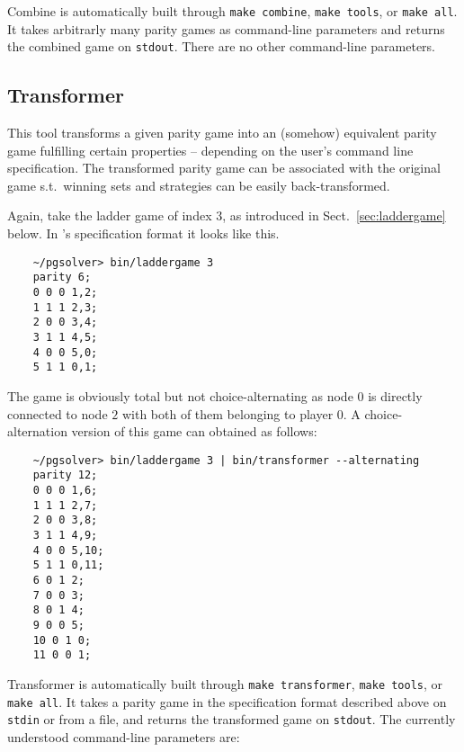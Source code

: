 Combine is automatically built through \verb#make combine#,
\verb#make tools#, or \verb#make all#.
It takes arbitrarly many parity games as command-line parameters and returns the
combined game on \texttt{stdout}. There are no other command-line parameters.


\subsection{Transformer}

This tool transforms a given parity game into an (somehow) equivalent parity game fulfilling
certain properties -- depending on the user's command line specification. The transformed
parity game can be associated with the original game s.t.\ winning sets and strategies can
be easily back-transformed.


\begin{example}
Again, take the ladder game of index 3, as introduced in Sect.~\ref{sec:laddergame} below.
In \pgsolver's specification format it looks like this.
\begin{verbatim}
    ~/pgsolver> bin/laddergame 3
    parity 6;
    0 0 0 1,2;
    1 1 1 2,3;
    2 0 0 3,4;
    3 1 1 4,5;
    4 0 0 5,0;
    5 1 1 0,1;
\end{verbatim}
The game is obviously total but not choice-alternating as node $0$ is directly connected to node $2$
with both of them belonging to player $0$. A choice-alternation version of this game can obtained as follows:
\begin{verbatim}
    ~/pgsolver> bin/laddergame 3 | bin/transformer --alternating
    parity 12;
    0 0 0 1,6;
    1 1 1 2,7;
    2 0 0 3,8;
    3 1 1 4,9;
    4 0 0 5,10;
    5 1 1 0,11;
    6 0 1 2;
    7 0 0 3;
    8 0 1 4;
    9 0 0 5;
    10 0 1 0;
    11 0 0 1;
\end{verbatim}
\end{example}

Transformer is automatically built through \verb#make transformer#,
\verb#make tools#, or \verb#make all#.
It takes a parity game in the specification format described above on \texttt{stdin} or from a file,
and returns the transformed game on \texttt{stdout}. The currently understood command-line parameters are:

